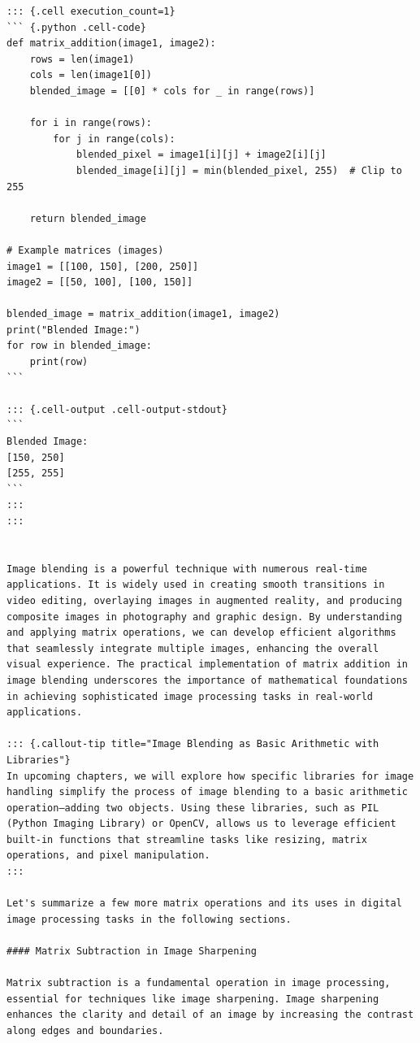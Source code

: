 \documentclass[
  letterpaper,
  DIV=11,
  numbers=noendperiod]{scrreprt}
\theoremstyle{plain}
\theoremstyle{definition}
\theoremstyle{remark}
\begin{document}
\begin{verbatim}
::: {.cell execution_count=1}
``` {.python .cell-code}
def matrix_addition(image1, image2):
    rows = len(image1)
    cols = len(image1[0])
    blended_image = [[0] * cols for _ in range(rows)]

    for i in range(rows):
        for j in range(cols):
            blended_pixel = image1[i][j] + image2[i][j]
            blended_image[i][j] = min(blended_pixel, 255)  # Clip to 255

    return blended_image

# Example matrices (images)
image1 = [[100, 150], [200, 250]]
image2 = [[50, 100], [100, 150]]

blended_image = matrix_addition(image1, image2)
print("Blended Image:")
for row in blended_image:
    print(row)
```

::: {.cell-output .cell-output-stdout}
```
Blended Image:
[150, 250]
[255, 255]
```
:::
:::


Image blending is a powerful technique with numerous real-time applications. It is widely used in creating smooth transitions in video editing, overlaying images in augmented reality, and producing composite images in photography and graphic design. By understanding and applying matrix operations, we can develop efficient algorithms that seamlessly integrate multiple images, enhancing the overall visual experience. The practical implementation of matrix addition in image blending underscores the importance of mathematical foundations in achieving sophisticated image processing tasks in real-world applications.

::: {.callout-tip title="Image Blending as Basic Arithmetic with Libraries"}
In upcoming chapters, we will explore how specific libraries for image handling simplify the process of image blending to a basic arithmetic operation—adding two objects. Using these libraries, such as PIL (Python Imaging Library) or OpenCV, allows us to leverage efficient built-in functions that streamline tasks like resizing, matrix operations, and pixel manipulation.
:::

Let's summarize a few more matrix operations and its uses in digital image processing tasks in the following sections.

#### Matrix Subtraction in Image Sharpening

Matrix subtraction is a fundamental operation in image processing, essential for techniques like image sharpening. Image sharpening enhances the clarity and detail of an image by increasing the contrast along edges and boundaries.


\end{verbatim}
\end{document}
